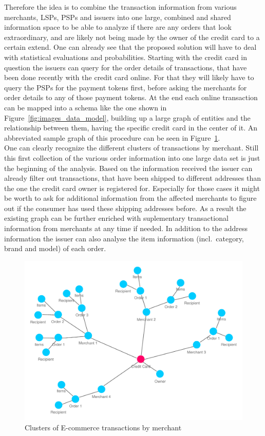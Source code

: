 Therefore the idea is to combine the transaction information from various merchants, \gls{LSP}s, \gls{PSP}s and issuers into one large, combined and shared information space to be able to analyze if there are any orders that look extraordinary, and are likely not being made by the owner of the credit card to a certain extend. One can already see that the proposed solution will have to deal with statistical evaluations and probabilities. Starting with the credit card in question the issuers can query for the order details of transactions, that have been done recently with the credit card online. For that they will likely have to query the \gls{PSP}s for the payment tokens first, before asking the merchants for order details to any of those payment tokens. At the end each online transaction can be mapped into a schema like the one shown in Figure~\ref{fig:images_data_model}, building up a large graph of entities and  the relationship between them, having the specific credit card in the center of it. An abbreviated sample graph of this procedure can be seen in Figure~\ref{fig:images_credit_card_graph}. \\

One can clearly recognize the different clusters of transactions by merchant. Still this first collection of the various order information into one large data set is just the beginning of the analysis. Based on the information received the issuer can already filter out transactions, that have been shipped to different addresses than the one the credit card owner is registered for. Especially for those cases it might be worth to ask for additional information from the affected merchants to figure out if the consumer has used these shipping addresses before. As a result the existing graph can be further enriched with suplementary transactional information from merchants at any time if needed. In addition to the address information the issuer can also analyse the item information (incl.\ category, brand and model) of each order. \\

\begin{figure}[!ht]
  \centering
  \includegraphics[width=0.9\columnwidth]{images/ontology_scenario_2.pdf}
  \caption{Clusters of E-commerce transactions by merchant}
\label{fig:images_credit_card_graph}
\end{figure}

